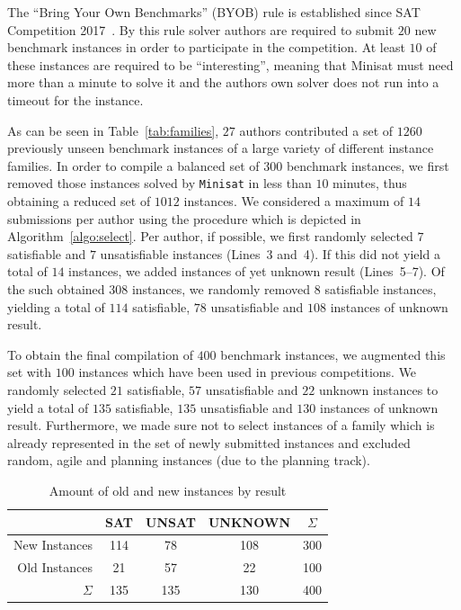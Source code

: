 \documentclass{elsarticle}
\newcommand{\solver}[1]{\texttt{#1}}
\begin{document}
The ``Bring Your Own Benchmarks'' (BYOB) rule is established since SAT Competition 2017~\cite{SC2017}. 
By this rule solver authors are required to submit $20$ new benchmark instances in order to participate in the competition. At least $10$ of these instances are required to be ``interesting'', meaning that Minisat must need more than a minute to solve it and the authors own solver does not run into a timeout for the instance. 

As can be seen in Table~\ref{tab:families}, $27$ authors contributed a set of $1260$ previously unseen benchmark instances of a large variety of different instance families. 
In order to compile a balanced set of $300$ benchmark instances, we first removed those instances solved by \solver{Minisat} in less than $10$ minutes, thus obtaining a reduced set of $1012$ instances. 
We considered a maximum of $14$ submissions per author using the procedure which is depicted in Algorithm~\ref{algo:select}. 
Per author, if possible, we first randomly selected $7$ satisfiable and $7$ unsatisfiable instances (Lines~3 and~4). 
If this did not yield a total of $14$ instances, we added instances of yet unknown result (Lines~5--7). 
Of the such obtained $308$ instances, we randomly removed $8$ satisfiable instances, yielding a total of $114$ satisfiable, $78$ unsatisfiable and $108$ instances of unknown result. 

To obtain the final compilation of $400$ benchmark instances, we augmented this set with $100$ instances which have been used in previous competitions. 
We randomly selected $21$ satisfiable, $57$ unsatisfiable and $22$ unknown instances to yield a total of $135$ satisfiable, $135$ unsatisfiable and $130$ instances of unknown result. 
Furthermore, we made sure not to select instances of a family which is already represented in the set of newly submitted instances and excluded random, agile and planning instances (due to the planning track). 

\begin{table}[t]
\centering
\begin{tabular}{rcccc}
 & SAT & UNSAT & UNKNOWN & $\Sigma$\\
\hline
New Instances & 114 & 78 & 108 & 300 \\
Old Instances & 21 & 57 & 22 & 100\\
\hline
$\Sigma$ & 135 & 135 & 130 & 400
\end{tabular}
\caption{Amount of old and new instances by result}
\label{tab:final}
\end{table}
\end{document}
